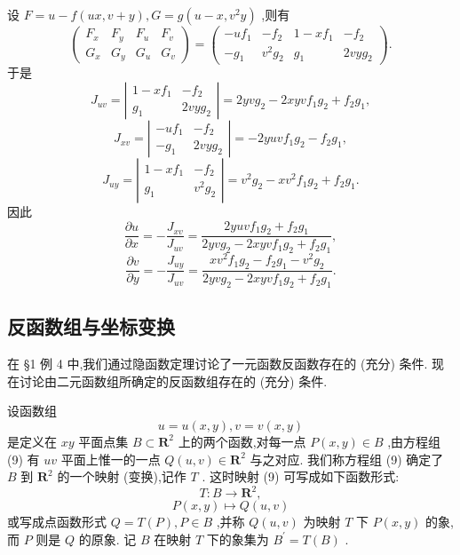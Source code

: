 \begin{solution}

\end{solution}
设 \(F = u - f\left( {{ux},v + y}\right) ,G = g\left( {u - x,{v}^{2}y}\right)\) ,则有
\[
\left( \begin{array}{llll} {F}_{x} & {F}_{y} & {F}_{u} & {F}_{v} \\  {G}_{x} & {G}_{y} & {G}_{u} & {G}_{v} \end{array}\right)  = \left( \begin{matrix}  - u{f}_{1} &  - {f}_{2} & 1 - x{f}_{1} &  - {f}_{2} \\   - {g}_{1} & {v}^{2}{g}_{2} & {g}_{1} & {2vy}{g}_{2} \end{matrix}\right) .
\]
于是
\[
{J}_{uv} = \left| \begin{matrix} 1 - x{f}_{1} &  - {f}_{2} \\  {g}_{1} & {2vy}{g}_{2} \end{matrix}\right|  = {2yv}{g}_{2} - {2xyv}{f}_{1}{g}_{2} + {f}_{2}{g}_{1},
\]
\[
{J}_{xv} = \left| \begin{matrix}  - u{f}_{1} &  - {f}_{2} \\   - {g}_{1} & {2vy}{g}_{2} \end{matrix}\right|  =  - {2yuv}{f}_{1}{g}_{2} - {f}_{2}{g}_{1},
\]
\[
{J}_{uy} = \left| \begin{matrix} 1 - x{f}_{1} &  - {f}_{2} \\  {g}_{1} & {v}^{2}{g}_{2} \end{matrix}\right|  = {v}^{2}{g}_{2} - x{v}^{2}{f}_{1}{g}_{2} + {f}_{2}{g}_{1}.
\]
因此
\[
\frac{\partial u}{\partial x} =  - \frac{{J}_{xv}}{{J}_{uv}} = \frac{{2yuv}{f}_{1}{g}_{2} + {f}_{2}{g}_{1}}{{2yv}{g}_{2} - {2xyv}{f}_{1}{g}_{2} + {f}_{2}{g}_{1}},
\]
\[
\frac{\partial v}{\partial y} =  - \frac{{J}_{uy}}{{J}_{uv}} = \frac{x{v}^{2}{f}_{1}{g}_{2} - {f}_{2}{g}_{1} - {v}^{2}{g}_{2}}{{2yv}{g}_{2} - {2xyv}{f}_{1}{g}_{2} + {f}_{2}{g}_{1}}.
\]
\subsection{反函数组与坐标变换}

在 §1 例 4 中,我们通过隐函数定理讨论了一元函数反函数存在的 (充分) 条件. 现在讨论由二元函数组所确定的反函数组存在的 (充分) 条件.

设函数组
\[
u = u\left( {x,y}\right) ,v = v\left( {x,y}\right)  \tag{9}
\]
是定义在 \({xy}\) 平面点集 \(B \subset  {\mathbf{R}}^{2}\) 上的两个函数,对每一点 \(P\left( {x,y}\right)  \in  B\) ,由方程组 (9) 有 \({uv}\) 平面上惟一的一点 \(Q\left( {u,v}\right)  \in  {\mathbf{R}}^{2}\) 与之对应. 我们称方程组 (9) 确定了 \(B\) 到 \({\mathbf{R}}^{2}\) 的一个映射 (变换),记作 \(T\) . 这时映射 (9) 可写成如下函数形式:
\[
T : B \rightarrow  {\mathbf{R}}^{2},
\]
\[
P\left( {x,y}\right)  \mapsto  Q\left( {u,v}\right)
\]
或写成点函数形式 \(Q = T\left( P\right) ,P \in  B\) ,并称 \(Q\left( {u,v}\right)\) 为映射 \(T\) 下 \(P\left( {x,y}\right)\) 的象,而 \(P\) 则是 \(Q\) 的原象. 记 \(B\) 在映射 \(T\) 下的象集为 \({B}^{\prime } = T\left( B\right)\) .

